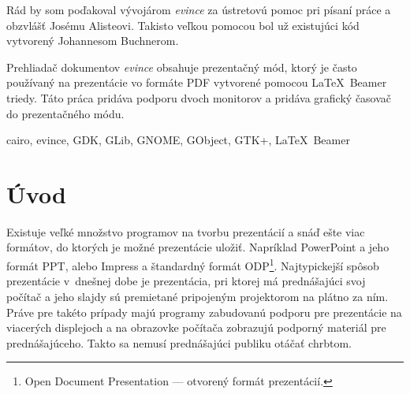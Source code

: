 \documentclass[12pt,oneside,final]{fithesis2}
\begin{document}
\FrontMatter
\ThesisTitlePage




\begin{ThesisDeclaration}
\DeclarationText
\AdvisorName
\end{ThesisDeclaration}

\begin{ThesisThanks}
Rád by som poďakoval vývojárom \emph{evince} za ústretovú pomoc pri písaní práce a obzvlášť Josému Alisteovi. Takisto veľkou pomocou bol už existujúci kód vytvorený Johannesom Buchnerom.
\end{ThesisThanks}  

\begin{ThesisAbstract}
Prehliadač dokumentov \emph{evince} obsahuje prezentačný mód, ktorý je často používaný na prezentácie vo formáte PDF vytvorené pomocou \LaTeX~Beamer triedy. Táto práca pridáva podporu dvoch monitorov a pridáva grafický časovač do prezentačného módu.
\end{ThesisAbstract}

\begin{ThesisKeyWords}
cairo, evince, GDK, GLib, GNOME, GObject, GTK+, \LaTeX~Beamer
\end{ThesisKeyWords}
 
\MainMatter
\setcounter{tocdepth}{3}
\tableofcontents 
 
\chapter{Úvod}

Existuje veľké množstvo programov na tvorbu prezentácií a snáď ešte viac formátov, do ktorých je možné prezentácie uložiť. Napríklad PowerPoint a jeho formát PPT, alebo Impress a štandardný formát ODP\footnote{Open Document Presentation --- otvorený formát prezentácií.}. Najtypickejší spôsob prezentácie v~dnešnej dobe je prezentácia, pri ktorej má prednášajúci svoj počítač a jeho slajdy sú premietané pripojeným projektorom na plátno za ním. Práve pre takéto prípady majú programy zabudovanú podporu pre prezentácie na viacerých displejoch a na obrazovke počítača zobrazujú podporný materiál pre prednášajúceho. Takto sa nemusí prednášajúci publiku otáčať chrbtom.
\end{document}
